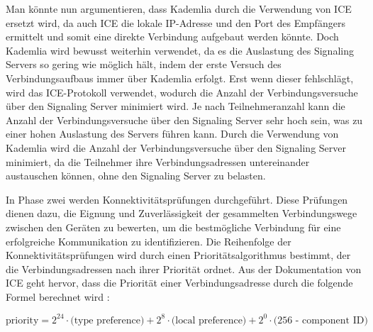 Man könnte nun argumentieren, dass Kademlia durch die Verwendung von ICE ersetzt wird, da auch ICE  die lokale IP-Adresse und den Port des Empfängers ermittelt und somit eine direkte Verbindung aufgebaut werden könnte. Doch Kademlia wird bewusst weiterhin verwendet, da es die Auslastung des Signaling Servers so gering wie möglich hält, indem der erste Versuch des Verbindungsaufbaus immer über Kademlia erfolgt. Erst wenn dieser fehlschlägt, wird das ICE-Protokoll verwendet, wodurch die Anzahl der Verbindungsversuche über den Signaling Server minimiert wird. Je nach Teilnehmeranzahl kann die Anzahl der Verbindungsversuche über den Signaling Server sehr hoch sein, was zu einer hohen Auslastung des Servers führen kann. Durch die Verwendung von Kademlia wird die Anzahl der Verbindungsversuche über den Signaling Server minimiert, da die Teilnehmer ihre Verbindungsadressen untereinander austauschen können, ohne den Signaling Server zu belasten.

In Phase zwei werden Konnektivitätsprüfungen durchgeführt. Diese Prüfungen dienen dazu, die Eignung und Zuverlässigkeit der gesammelten Verbindungswege zwischen den Geräten zu bewerten, um die bestmögliche Verbindung für eine erfolgreiche Kommunikation zu identifizieren. Die Reihenfolge der Konnektivitätsprüfungen wird durch einen Prioritätsalgorithmus bestimmt, der die Verbindungsadressen nach ihrer Priorität ordnet. Aus der Dokumentation von ICE geht hervor, dass die Priorität einer Verbindungsadresse durch die folgende Formel berechnet wird \parencite[S. 22]{rfc8445_ICE}:

\begin{equation}
    \label{eq:ice_priority}
    \text{priority} = \text{2}^{24} \cdot \text{(type preference)} + \text{2}^{8} \cdot \text{(local preference)} + \text{2}^{0} \cdot \text{(256 - component ID)}
\end{equation}

